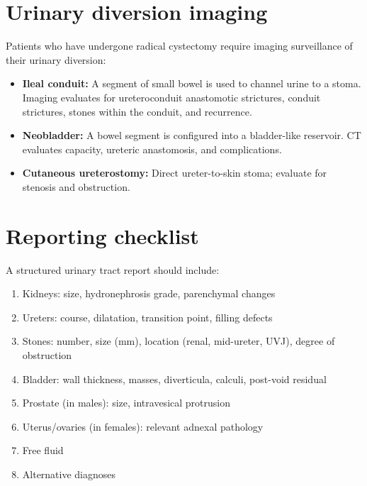 \section{Urinary diversion imaging}
Patients who have undergone radical cystectomy require imaging surveillance of their urinary diversion:
\begin{itemize}
    \item \textbf{Ileal conduit:} A segment of small bowel is used to channel urine to a stoma. Imaging evaluates for ureteroconduit anastomotic strictures, conduit strictures, stones within the conduit, and recurrence.
    \item \textbf{Neobladder:} A bowel segment is configured into a bladder-like reservoir. CT evaluates capacity, ureteric anastomosis, and complications.
    \item \textbf{Cutaneous ureterostomy:} Direct ureter-to-skin stoma; evaluate for stenosis and obstruction.
\end{itemize}

\section{Reporting checklist}
A structured urinary tract report should include:
\begin{enumerate}
    \item Kidneys: size, hydronephrosis grade, parenchymal changes
    \item Ureters: course, dilatation, transition point, filling defects
    \item Stones: number, size (mm), location (renal, mid-ureter, UVJ), degree of obstruction
    \item Bladder: wall thickness, masses, diverticula, calculi, post-void residual
    \item Prostate (in males): size, intravesical protrusion
    \item Uterus/ovaries (in females): relevant adnexal pathology
    \item Free fluid
    \item Alternative diagnoses
\end{enumerate}

\clearpage
